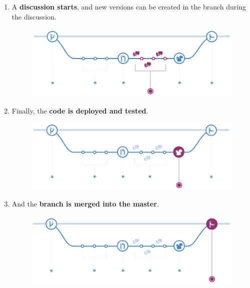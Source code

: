 \begin{enumerate}
    \item A \textbf{discussion starts}, and new versions can be created in the branch during the discussion.
    \begin{figure}[!htp]
        \centering
        \includegraphics[width=.8\textwidth]{img/git-4.png}
    \end{figure}

    \item Finally, the \textbf{code is deployed and tested}.
    \begin{figure}[!htp]
        \centering
        \includegraphics[width=.8\textwidth]{img/git-5.png}
    \end{figure}

    \item And the \textbf{branch is merged into the master}.
    \begin{figure}[!htp]
        \centering
        \includegraphics[width=.8\textwidth]{img/git-6.png}
    \end{figure}
\end{enumerate}